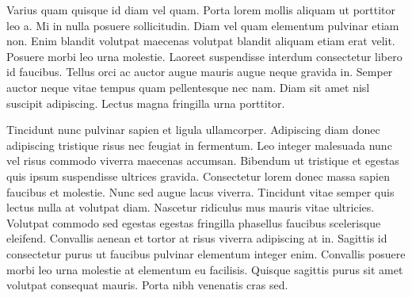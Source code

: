 Varius quam quisque id diam vel quam. Porta lorem mollis aliquam ut porttitor leo a. Mi in nulla posuere sollicitudin. Diam vel quam elementum pulvinar etiam non. Enim blandit volutpat maecenas volutpat blandit aliquam etiam erat velit. Posuere morbi leo urna molestie. Laoreet suspendisse interdum consectetur libero id faucibus. Tellus orci ac auctor augue mauris augue neque gravida in. Semper auctor neque vitae tempus quam pellentesque nec nam. Diam sit amet nisl suscipit adipiscing. Lectus magna fringilla urna porttitor.

Tincidunt nunc pulvinar sapien et ligula ullamcorper. Adipiscing diam donec adipiscing tristique risus nec feugiat in fermentum. Leo integer malesuada nunc vel risus commodo viverra maecenas accumsan. Bibendum ut tristique et egestas quis ipsum suspendisse ultrices gravida. Consectetur lorem donec massa sapien faucibus et molestie. Nunc sed augue lacus viverra. Tincidunt vitae semper quis lectus nulla at volutpat diam. Nascetur ridiculus mus mauris vitae ultricies. Volutpat commodo sed egestas egestas fringilla phasellus faucibus scelerisque eleifend. Convallis aenean et tortor at risus viverra adipiscing at in. Sagittis id consectetur purus ut faucibus pulvinar elementum integer enim. Convallis posuere morbi leo urna molestie at elementum eu facilisis. Quisque sagittis purus sit amet volutpat consequat mauris. Porta nibh venenatis cras sed.


